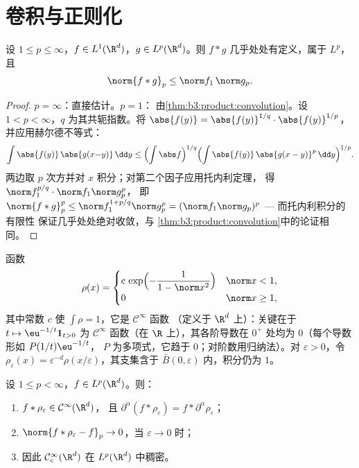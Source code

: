 \section{卷积与正则化}

\begin{theorem}[杨不等式]\label{thm:b3:lp:young}
设 $1 \leq p \leq \infty$，$f \in L^1(\R^d)$，$g \in
L^p(\R^d)$。则 $f * g$ 几乎处处有定义，属于 $L^p$，
且
\[
\norm{f * g}_p \leq \norm f_1\,\norm g_p .
\]
\end{theorem}

\begin{proof}
$p = \infty$：直接估计。$p = 1$：
由\cref{thm:b3:product:convolution}。设 $1 < p < \infty$，$q$
为其共轭指数。将 $\abs{f(y)} = \abs{f(y)}^{1/q}\cdot
\abs{f(y)}^{1/p}$，并应用赫尔德不等式：
\[
\int\abs{f(y)}\,\abs{g(x{-}y)}\,\dd y
\leq \Bigl(\int\abs f\Bigr)^{1/q}
\Bigl(\int\abs{f(y)}\,\abs{g(x - y)}^p\,\dd y\Bigr)^{1/p} .
\]
两边取 $p$ 次方并对 $x$ 积分；对第二个因子应用托内利定理，
得 $\norm f_1^{p/q}\cdot\norm f_1\norm g_p^p$，
即 $\norm{f*g}_p^p \leq \norm f_1^{1 + p/q}\norm g_p^p =
(\norm f_1\norm g_p)^p$ --- 而托内利积分的有限性
保证几乎处处绝对收敛，与
\cref{thm:b3:product:convolution}中的论证相同。
\end{proof}

\begin{definition}[磨光子]\label{def:b3:lp:mollifier}
函数
\[
\rho(x) = \begin{cases}
c\,\exp\Bigl(-\dfrac{1}{1 - \norm x^2}\Bigr) & \norm x < 1,\\
0 & \norm x \geq 1,
\end{cases}
\]
其中常数 $c$ 使 $\int\rho = 1$，它是 $\mathcal C^\infty$ 函数
（定义于 $\R^d$ 上）：关键在于 $t \mapsto \eu^{-1/t}\mathbf
1_{t>0}$ 为 $\mathcal C^\infty$ 函数（在 $\R$ 上），其各阶导数在
$0^+$ 处均为 $0$（每个导数形如 $P(1/t)\eu^{-1/t}$，
$P$ 为多项式，它趋于 $0$；对阶数用归纳法）。对
$\varepsilon > 0$，令 $\rho_\varepsilon(x) =
\varepsilon^{-d}\rho(x/\varepsilon)$，其支集含于 $\bar B(0,
\varepsilon)$ 内，积分仍为 $1$。
\end{definition}

\begin{theorem}[正则化]\label{thm:b3:lp:regularization}
设 $1 \leq p < \infty$，$f \in L^p(\R^d)$。则：
\begin{enumerate}
  \item $f * \rho_\varepsilon \in \mathcal C^\infty(\R^d)$，
        且 $\partial^\alpha(f * \rho_\varepsilon) = f *
        \partial^\alpha\rho_\varepsilon$；
  \item $\norm{f * \rho_\varepsilon - f}_p \to 0$，当
        $\varepsilon \to 0$ 时；
  \item 因此 $\mathcal C^\infty_c(\R^d)$ 在
        $L^p(\R^d)$ 中稠密。
\end{enumerate}
\end{theorem}

